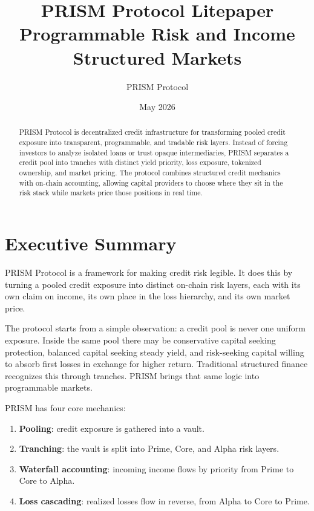 \documentclass[11pt]{article}
\title{\textbf{PRISM Protocol Litepaper}\\
\large Programmable Risk and Income Structured Markets}
\author{PRISM Protocol}
\date{May 2026}
\begin{document}
\maketitle

\begin{abstract}
PRISM Protocol is decentralized credit infrastructure for transforming pooled
credit exposure into transparent, programmable, and tradable risk layers. Instead
of forcing investors to analyze isolated loans or trust opaque intermediaries,
PRISM separates a credit pool into tranches with distinct yield priority, loss
exposure, tokenized ownership, and market pricing. The protocol combines
structured credit mechanics with on-chain accounting, allowing capital providers
to choose where they sit in the risk stack while markets price those positions in
real time.
\end{abstract}

\tableofcontents
\newpage

\section{Executive Summary}

PRISM Protocol is a framework for making credit risk legible. It does this by
turning a pooled credit exposure into distinct on-chain risk layers, each with
its own claim on income, its own place in the loss hierarchy, and its own market
price.

The protocol starts from a simple observation: a credit pool is never one
uniform exposure. Inside the same pool there may be conservative capital seeking
protection, balanced capital seeking steady yield, and risk-seeking capital
willing to absorb first losses in exchange for higher return. Traditional
structured finance recognizes this through tranches. PRISM brings that same
logic into programmable markets.

PRISM has four core mechanics:

\begin{enumerate}
  \item \textbf{Pooling}: credit exposure is gathered into a vault.
  \item \textbf{Tranching}: the vault is split into Prime, Core, and Alpha risk
  layers.
  \item \textbf{Waterfall accounting}: incoming income flows by priority from
  Prime to Core to Alpha.
  \item \textbf{Loss cascading}: realized losses flow in reverse, from Alpha to
  Core to Prime.
\end{enumerate}
\end{document}
